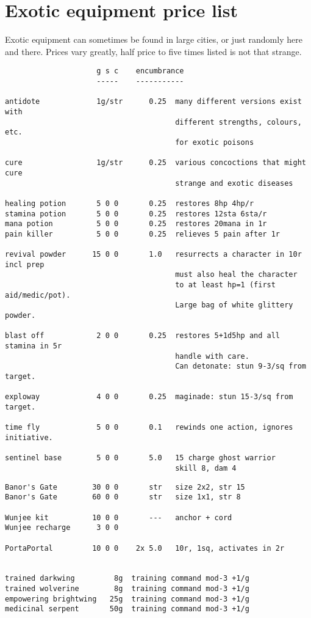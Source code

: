 \pagebreak[1]
\section*{Exotic equipment price list}

Exotic equipment can sometimes be found in large cities, or just randomly here and there. Prices vary greatly, half price to five times listed is not that strange.

\small
\begin{verbatim}
                     g s c    encumbrance
                     -----    -----------

antidote             1g/str      0.25  many different versions exist with
                                       different strengths, colours, etc.
                                       for exotic poisons

cure                 1g/str      0.25  various concoctions that might cure
                                       strange and exotic diseases

healing potion       5 0 0       0.25  restores 8hp 4hp/r
stamina potion       5 0 0       0.25  restores 12sta 6sta/r
mana potion          5 0 0       0.25  restores 20mana in 1r
pain killer          5 0 0       0.25  relieves 5 pain after 1r

revival powder      15 0 0       1.0   resurrects a character in 10r incl prep
                                       must also heal the character
                                       to at least hp=1 (first aid/medic/pot).
                                       Large bag of white glittery powder.

blast off            2 0 0       0.25  restores 5+1d5hp and all stamina in 5r
                                       handle with care.
                                       Can detonate: stun 9-3/sq from target.

exploway             4 0 0       0.25  maginade: stun 15-3/sq from target.

time fly             5 0 0       0.1   rewinds one action, ignores initiative.

sentinel base        5 0 0       5.0   15 charge ghost warrior
                                       skill 8, dam 4

\end{verbatim} \pagebreak[1] \begin{verbatim}
Banor's Gate        30 0 0       str   size 2x2, str 15
Banor's Gate        60 0 0       str   size 1x1, str 8

Wunjee kit          10 0 0       ---   anchor + cord
Wunjee recharge      3 0 0

PortaPortal         10 0 0    2x 5.0   10r, 1sq, activates in 2r


trained darkwing         8g  training command mod-3 +1/g
trained wolverine        8g  training command mod-3 +1/g
empowering brightwing   25g  training command mod-3 +1/g
medicinal serpent       50g  training command mod-3 +1/g

\end{verbatim}
